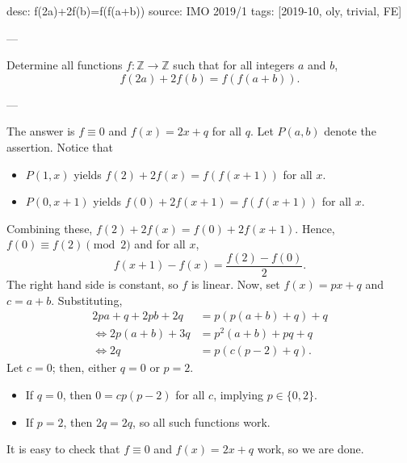 desc: f(2a)+2f(b)=f(f(a+b))
source: IMO 2019/1
tags: [2019-10, oly, trivial, FE]

---

Determine all functions $f:\mathbb Z\to\mathbb Z$ such that for all integers $a$ and $b$, \[f(2a)+2f(b)=f(f(a+b)).\]

---

The answer is $f\equiv0$ and $f(x)=2x+q$ for all $q$. Let $P(a,b)$ denote the assertion. Notice that
\begin{itemize}
    \item $P(1,x)$ yields $f(2)+2f(x)=f(f(x+1))$ for all $x$.
        \vspace{-0.5em}
    \item $P(0,x+1)$ yields $f(0)+2f(x+1)=f(f(x+1))$ for all $x$.
\end{itemize}
Combining these, $f(2)+2f(x)=f(0)+2f(x+1)$. Hence, $f(0)\equiv f(2)\pmod2$ and for all $x$, \[f(x+1)-f(x)=\frac{f(2)-f(0)}2.\]
The right hand side is constant, so $f$ is linear. Now, set $f(x)=px+q$ and $c=a+b$. Substituting,
\begin{align*}
    2pa+q+2pb+2q&=p(p(a+b)+q)+q\\
    \iff2p(a+b)+3q&=p^2(a+b)+pq+q\\
    \iff2q&=p(c(p-2)+q).
\end{align*}
Let $c=0$; then, either $q=0$ or $p=2$.
\begin{itemize}
    \item If $q=0$, then $0=cp(p-2)$ for all $c$, implying $p\in\{0,2\}$.
        \vspace{-0.5em}
    \item If $p=2$, then $2q=2q$, so all such functions work.
\end{itemize}
It is easy to check that $f\equiv0$ and $f(x)=2x+q$ work, so we are done.
